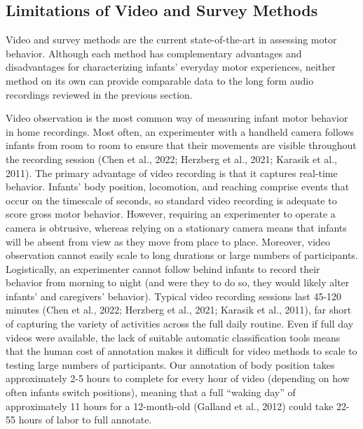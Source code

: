 \documentclass[
  man]{apa6}
\begin{document}
\hypertarget{limitations-of-video-and-survey-methods}{%
\subsection{Limitations of Video and Survey Methods}\label{limitations-of-video-and-survey-methods}}

Video and survey methods are the current state-of-the-art in assessing motor behavior. Although each method has complementary advantages and disadvantages for characterizing infants' everyday motor experiences, neither method on its own can provide comparable data to the long form audio recordings reviewed in the previous section.

Video observation is the most common way of measuring infant motor behavior in home recordings. Most often, an experimenter with a handheld camera follows infants from room to room to ensure that their movements are visible throughout the recording session (Chen et al., 2022; Herzberg et al., 2021; Karasik et al., 2011). The primary advantage of video recording is that it captures real-time behavior. Infants' body position, locomotion, and reaching comprise events that occur on the timescale of seconds, so standard video recording is adequate to score gross motor behavior. However, requiring an experimenter to operate a camera is obtrusive, whereas relying on a stationary camera means that infants will be absent from view as they move from place to place. Moreover, video observation cannot easily scale to long durations or large numbers of participants. Logistically, an experimenter cannot follow behind infants to record their behavior from morning to night (and were they to do so, they would likely alter infants' and caregivers' behavior). Typical video recording sessions last 45-120 minutes (Chen et al., 2022; Herzberg et al., 2021; Karasik et al., 2011), far short of capturing the variety of activities across the full daily routine. Even if full day videos were available, the lack of suitable automatic classification tools means that the human cost of annotation makes it difficult for video methods to scale to testing large numbers of participants. Our annotation of body position takes approximately 2-5 hours to complete for every hour of video (depending on how often infants switch positions), meaning that a full ``waking day'' of approximately 11 hours for a 12-month-old (Galland et al., 2012) could take 22-55 hours of labor to full annotate.
\end{document}
